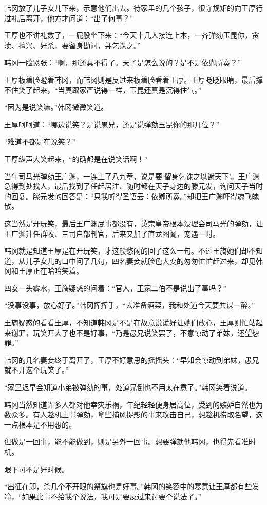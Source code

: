 韩冈放了儿子女儿下来，示意他们出去。待家里的几个孩子，很守规矩的向王厚行过礼后离开，他方才问道：“出了何事？”

王厚也不讲礼数了，一屁股坐下来：“今天十几人接连上本，一齐弹劾玉昆你，贪渎、擅兴、好杀，要留身勘问，并乞诛之。”

韩冈一脸紧张：“啊，那还真不得了。天子是怎么说的？是不是依卿所奏？”

王厚板着脸瞪着韩冈，而韩冈则是反过来板着脸看着王厚。王厚眨眨眼睛，最后撑不住笑了起来，“当真跟家严说得一样，玉昆还真是沉得住气。”

“因为是说笑嘛。”韩冈微微笑道。

王厚呵呵道：“哪边说笑？是说愚兄，还是说弹劾玉昆你的那几位？”

“难道不都是在说笑？”

王厚纵声大笑起来，“的确都是在说笑话啊！”

当年司马光弹劾王广渊，一连上了八九章，说是要‘留身乞诛之以谢天下’。王广渊急得到处找人，最后找到了任起居注、随时都在天子身边的滕元发，询问天子当时的回复。滕元发的回答是：“只我听得圣语云：依卿所奏。”却把王广渊吓得魂飞魄散。

这当然是开玩笑，最后王广渊屁事都没有，英宗皇帝根本没理会司马光的弹劾，让王广渊升任群牧、三司户部判官，后来又加了直龙图阁，宠遇一时。

韩冈就是知道王厚是在开玩笑，才这般悠闲的回了这么一句。不过王旖她们却不知道，从儿子女儿的口中问了几句，四名妻妾就脸色大变的匆匆忙忙赶过来，却见韩冈和王厚正在哈哈笑着。

四女一头雾水，王旖疑惑的问着：“官人，王家二伯不是说出了事吗？”

“没事没事，放心好了。”韩冈挥挥手，“去准备酒菜，我和处道今天要共谋一醉。”

王旖疑惑的看看王厚，不知道韩冈是不是在故意说谎好让她们放心，王厚则忙站起来谢罪，玩笑开大了也不是好事，“乃是愚兄说笑罢了，不意惊动了弟妹，还望恕罪。”

韩冈的几名妻妾终于离开了，王厚不好意思的摇摇头：“早知会惊动到弟妹，愚兄就不开这个玩笑了。”

“家里迟早会知道小弟被弹劾的事，处道兄倒也不用太在意了。”韩冈笑着说道。

韩冈当然知道许多人都对他幸灾乐祸，年纪轻轻便身居高位，受到的嫉妒自然也为数众多。有人趁机上书弹劾，拿些捕风捉影的事来攻击自己，想趁机捞取名望，这一点根本是不用想的。

但做是一回事，能不能做到，则是另外一回事。想要弹劾他韩冈，也得先看准时机。

眼下可不是好时候。

“出征在即，杀几个不开眼的祭旗也是好事。”韩冈的笑容中的寒意让王厚都有些发冷，“如果此事不给我个说法，我可是要反过来讨要个说法了。”

